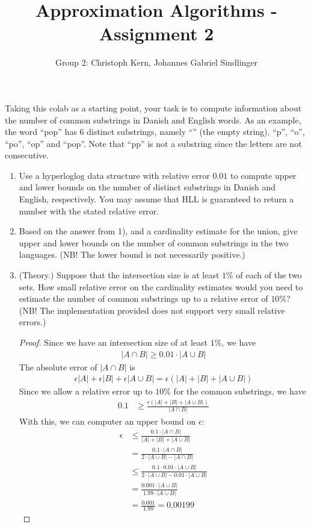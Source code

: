 \documentclass{article}
\title{Approximation Algorithms - Assignment 2}
\author{Group 2: Christoph Kern, Johannes Gabriel Sindlinger}
\begin{document}
\maketitle

Taking this colab as a starting point, your task is to compute information about the number of common substrings in Danish and English words. As an example, the word ``pop'' has 6 distinct substrings, namely ``'' (the empty string), ``p'', ``o'', ``po'', ``op'' and ``pop''. Note that ``pp'' is not a substring since the letters are not consecutive.

\begin{enumerate}
    \item Use a hyperloglog data structure with relative error $0.01$ to compute upper and lower bounds on the number of distinct substrings in Danish and English, respectively. You may assume that HLL is guaranteed to return a number with the stated relative error.
    \item Based on the answer from 1), and a cardinality estimate for the union, give upper and lower bounds on the number of common substrings in the two languages. (NB! The lower bound is not necessarily positive.)
    \item (Theory.) Suppose that the intersection size is at least $1\%$ of each of the two sets. How small relative error on the cardinality estimates would you need to estimate the number of common substrings up to a relative error of $10\%$? (NB! The implementation provided does not support very small relative errors.)

    \begin{proof}
        Since we have an intersection size of at least $1\%$, we have
        \begin{align}
            |A \cap B| \ge 0.01 \cdot |A \cup B|
        \end{align}
        The absolute error of $|A \cap B|$ is
        \begin{align}
            \epsilon|A| + \epsilon|B| + \epsilon|A \cup B| = \epsilon(|A| + |B| + |A \cup B|)
        \end{align}
        Since we allow a relative error up to $10\%$ for the common substrings, we have
        \begin{align}
            0.1 &\ge \frac{\epsilon(|A| + |B| + |A \cup B|)}{|A \cap B|}
        \end{align}
        With this, we can computer an upper bound on $\epsilon$:
        \begin{align}
              \epsilon &\le \frac{0.1 \cdot |A \cap B|}{|A| + |B| + |A \cup B|}\\
              &= \frac{0.1 \cdot |A \cap B|}{2 \cdot |A \cup B| - |A \cap B|}\\
              &\le \frac{0.1 \cdot 0.01 \cdot |A \cup B|}{2 \cdot |A \cup B| - 0.01 \cdot |A \cup B|}\\
              &= \frac{0.001 \cdot |A \cup B|}{1.99 \cdot |A \cup B|}\\
              &= \frac{0.001}{1.99} = 0.00199
        \end{align}


\end{proof}
\end{enumerate}
\end{document}
